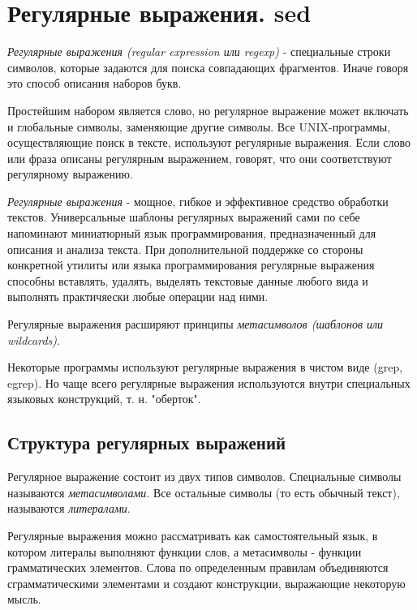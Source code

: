 \chapter{Регулярные выражения. sed}

\label{regexp}
\emph{Регулярные выражения (regular expression или regexp)} -  специальные строки символов, которые задаются для поиска совпадающих фрагментов. Иначе говоря это способ описания наборов букв. 

Простейшим набором является слово, но регулярное выражение может включать и глобальные символы, заменяющие другие символы. Все UNIX-программы, осуществляющие поиск в тексте, используют регулярные выражения. Если слово или фраза описаны регулярным выражением, говорят, что они соответствуют регулярному выражению. 

\emph{Регулярные выражения} - мощное, гибкое и эффективное средство обработки текстов. Универсальные шаблоны регулярных выражений сами по себе напоминают миниатюрный язык программирования, предназначенный для описания и анализа текста. При дополнительной поддержке со стороны конкретной утилиты или языка программирования регулярные выражения способны вставлять, удалять, выделять текстовые данные любого вида и выполнять практичяески любые операции над ними.

Регулярные выражения расширяют принципы \emph{метасимволов (шаблонов или wildcards)}. 

Некоторые программы используют регулярные выражения в чистом виде (grep, egrep). Но чаще всего регулярные выражения используются внутри специальных языковых конструкций, т. н. "оберток". 

\section{Структура регулярных выражений}

Регулярное выражение состоит из двух типов символов. Специальные символы называются \emph{метасимволами}. Все остальные символы (то есть обычный текст), называются \emph{литералами}.

Регулярные выражения можно рассматривать как самостоятельный язык, в котором литералы выполняют функции слов, а метасимволы - функции грамматических элементов. Слова по определенным правилам объединяются сграмматическими элементами и создают конструкции, выражающие некоторую мысль.

